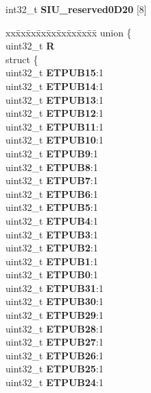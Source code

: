 \begin{DoxyCompactItemize}
\begin{tabbing}
\end{tabbing}\item 
\mbox{\label{structSIU__tag_adb81e2f370879a40765f38962dcdf23b}} 
int32\+\_\+t {\bfseries S\+I\+U\+\_\+reserved0\+D20} \mbox{[}8\mbox{]}
\item 
\mbox{\label{structSIU__tag_af9ac07eb5407eefacca6ac9433581c63}} 
\begin{tabbing}
xx\=xx\=xx\=xx\=xx\=xx\=xx\=xx\=xx\=\kill
union \{\\
\>uint32\_t {\bfseries R}\\
\>struct \{\\
\>\>uint32\_t {\bfseries ETPUB15}:1\\
\>\>uint32\_t {\bfseries ETPUB14}:1\\
\>\>uint32\_t {\bfseries ETPUB13}:1\\
\>\>uint32\_t {\bfseries ETPUB12}:1\\
\>\>uint32\_t {\bfseries ETPUB11}:1\\
\>\>uint32\_t {\bfseries ETPUB10}:1\\
\>\>uint32\_t {\bfseries ETPUB9}:1\\
\>\>uint32\_t {\bfseries ETPUB8}:1\\
\>\>uint32\_t {\bfseries ETPUB7}:1\\
\>\>uint32\_t {\bfseries ETPUB6}:1\\
\>\>uint32\_t {\bfseries ETPUB5}:1\\
\>\>uint32\_t {\bfseries ETPUB4}:1\\
\>\>uint32\_t {\bfseries ETPUB3}:1\\
\>\>uint32\_t {\bfseries ETPUB2}:1\\
\>\>uint32\_t {\bfseries ETPUB1}:1\\
\>\>uint32\_t {\bfseries ETPUB0}:1\\
\>\>uint32\_t {\bfseries ETPUB31}:1\\
\>\>uint32\_t {\bfseries ETPUB30}:1\\
\>\>uint32\_t {\bfseries ETPUB29}:1\\
\>\>uint32\_t {\bfseries ETPUB28}:1\\
\>\>uint32\_t {\bfseries ETPUB27}:1\\
\>\>uint32\_t {\bfseries ETPUB26}:1\\
\>\>uint32\_t {\bfseries ETPUB25}:1\\
\>\>uint32\_t {\bfseries ETPUB24}:1\\

\end{tabbing}
\end{DoxyCompactItemize}
